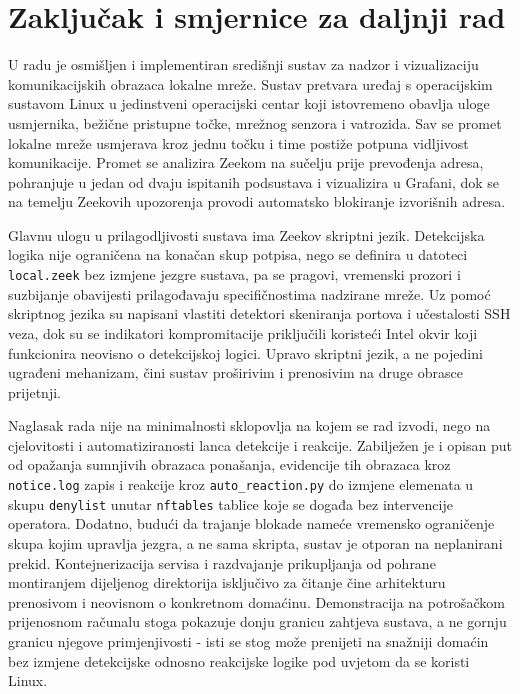 \chapter{Zaključak i smjernice za daljnji rad}

U radu je osmišljen i implementiran središnji sustav za nadzor i vizualizaciju komunikacijskih obrazaca lokalne mreže.
Sustav pretvara uređaj s operacijskim sustavom Linux u jedinstveni operacijski centar koji istovremeno obavlja uloge usmjernika, 
bežične pristupne točke, mrežnog senzora i vatrozida. Sav se promet lokalne mreže usmjerava kroz jednu točku i time postiže potpuna 
vidljivost komunikacije. Promet se analizira Zeekom na sučelju prije prevođenja adresa, pohranjuje u jedan od dvaju ispitanih 
podsustava i vizualizira u Grafani, dok se na temelju Zeekovih upozorenja provodi automatsko blokiranje izvorišnih adresa.

Glavnu ulogu u prilagodljivosti sustava ima Zeekov skriptni jezik. Detekcijska logika nije ograničena na konačan skup potpisa, nego se definira
u datoteci \texttt{local.zeek} bez izmjene jezgre sustava, pa se pragovi, vremenski prozori i suzbijanje obavijesti prilagođavaju specifičnostima 
nadzirane mreže. Uz pomoć skriptnog jezika su napisani vlastiti detektori skeniranja portova i učestalosti SSH veza, dok su se indikatori kompromitacije
priključili koristeći Intel okvir koji funkcionira neovisno o detekcijskoj logici. Upravo skriptni jezik, a ne pojedini ugrađeni mehanizam, čini sustav 
proširivim i prenosivim na druge obrasce prijetnji.

Naglasak rada nije na minimalnosti sklopovlja na kojem se rad izvodi, nego na cjelovitosti i automatiziranosti
lanca detekcije i reakcije. Zabilježen je i opisan put od opažanja sumnjivih obrazaca ponašanja, evidencije tih obrazaca kroz \texttt{notice.log} zapis i reakcije
kroz \texttt{auto\_reaction.py} do izmjene elemenata u skupu \texttt{denylist} unutar \texttt{nftables} tablice koje se događa bez intervencije operatora. 
Dodatno, budući da trajanje blokade nameće vremensko ograničenje skupa kojim upravlja jezgra, a ne sama skripta, sustav je otporan na neplanirani prekid.
Kontejnerizacija servisa i razdvajanje prikupljanja od pohrane montiranjem dijeljenog direktorija isključivo za čitanje čine arhitekturu prenosivom i neovisnom o 
konkretnom domaćinu. Demonstracija na potrošačkom prijenosnom računalu stoga pokazuje donju granicu zahtjeva sustava, a ne gornju granicu njegove 
primjenjivosti - isti se stog može prenijeti na snažniji domaćin bez izmjene detekcijske odnosno reakcijske logike pod uvjetom da se koristi Linux.

